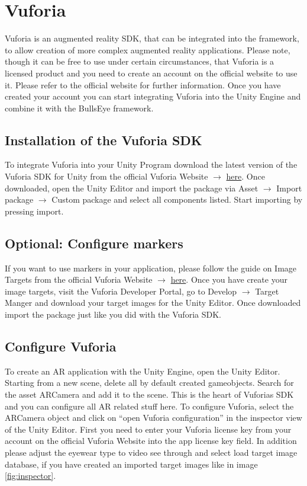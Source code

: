 \documentclass[../../masterdoc]{subfiles}
\begin{document}
\chapter{Vuforia}

Vuforia is an augmented reality SDK, that can be integrated into the framework, to allow creation of more complex augmented reality applications. Please note, though it can be free to use under certain circumstances, that Vuforia is a licensed product and you need to create an account on the official website to use it. Please refer to the official website for further information. Once you have created your account you can start integrating Vuforia into the Unity Engine and combine it with the BullsEye framework.

\section{Installation of the Vuforia SDK}
To integrate Vuforia into your Unity Program download the latest version of the Vuforia SDK for Unity from the official Vuforia Website $\rightarrow$ \href{https://developer.vuforia.com/downloads/sdk}{here}. Once downloaded, open the Unity Editor and import the package via Asset $\rightarrow$ Import package $\rightarrow$ Custom package and select all components listed. Start importing by pressing import.

\section{Optional: Configure markers}
If you want to use markers in your application, please follow the guide on Image Targets from the official Vuforia Website $\rightarrow$ \href{https://library.vuforia.com/articles/Training/Image-Target-Guide}{here}. Once you have create your image targets, visit the Vuforia Developer Portal, go to Develop $\rightarrow$ Target Manger and download your target images for the Unity Editor. Once downloaded import the package just like you did with the Vuforia SDK.

\section {Configure Vuforia}
To create an AR application with the Unity Engine, open the Unity Editor. Starting from a new scene, delete all by default created gameobjects. Search for the asset ARCamera and add it to the scene. This is the heart of Vuforias SDK and you can configure all AR related stuff here. To configure Vuforia, select the ARCamera object and click on ``open Vuforia configuration'' in the inspector view of the Unity Editor. First you need to enter your Vuforia license key from your account on the official Vuforia Website into the app license key field. In addition please adjust the eyewear type to video see through and select load target image database, if you have created an imported target images like in image \ref{fig:inspector}. 
\end{document}
